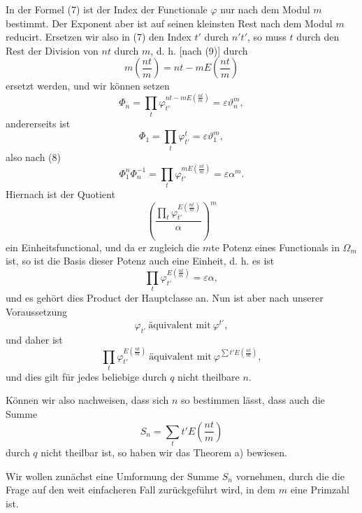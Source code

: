 \documentclass[11pt]{article}
\begin{document}
In der Formel (7) ist der Index der Functionale $\varphi$ nur nach dem Modul $m$ bestimmt. Der Exponent aber ist auf seinen kleinsten Rest nach dem Modul $m$ reducirt. Ersetzen wir also in (7) den Index $t'$ durch $n't'$, so muss $t$ durch den Rest der Division von $nt$ durch $m$, d. h. [nach (9)] durch
\[
m\left(\frac{nt}{m}\right)=nt-mE\left(\frac{nt}{m}\right)
\]
ersetzt werden, und wir können setzen
\[
\Phi_n=\prod_t \varphi_{t'}^{nt-mE(\frac{nt}{m})}=\varepsilon\vartheta_n^m,
\]
andererseits ist
\[
\Phi_1=\prod_t \varphi_{t'}^t=\varepsilon\vartheta_1^m,
\]
also nach (8)
\begin{equation}
\Phi_1^n\Phi_n^{-1}=\prod_t \varphi_{t'}^{mE(\frac{nt}{m})}=\varepsilon\alpha^m.
\tag{10}
\end{equation}
Hiernach ist der Quotient
\[
\left(\frac{\prod_t \varphi_{t'}^{E(\frac{nt}{m})}}{\alpha}\right)^m
\]
ein Einheitsfunctional, und da er zugleich die $m$te Potenz eines Functionals in $\Omega_m$ ist, so ist die Basis dieser Potenz auch eine Einheit, d. h. es ist
\[
\prod_t \varphi_{t'}^{E(\frac{nt}{m})}=\varepsilon\alpha,
\]
und es gehört dies Product der Hauptclasse an. Nun ist aber nach unserer Voraussetzung
\[
\varphi_{t'}\ \text{äquivalent mit}\ \varphi^{t'},
\]
und daher ist
\[
\prod_t \varphi_{t'}^{E(\frac{nt}{m})}\ \text{äquivalent mit}\ \varphi^{\sum t'E(\frac{nt}{m})},
\]
und dies gilt für jedes beliebige durch $q$ nicht theilbare $n$.

Können wir also nachweisen, dass sich $n$ so bestimmen lässt, dass auch die Summe
\[
S_n=\sum_t t'E\left(\frac{nt}{m}\right)
\]
durch $q$ nicht theilbar ist, so haben wir das Theorem a) bewiesen.

Wir wollen zunächst eine Umformung der Summe $S_n$ vornehmen, durch die die Frage auf den weit einfacheren Fall zurückgeführt wird, in dem $m$ eine Primzahl ist.
\end{document}
